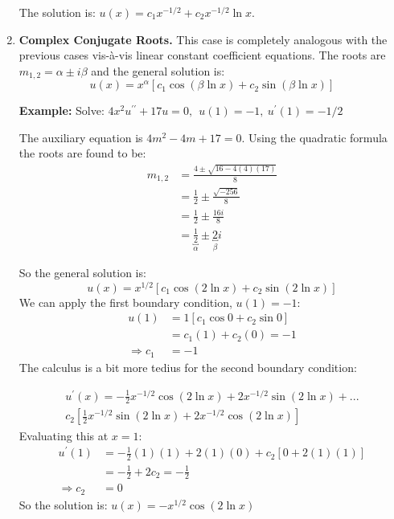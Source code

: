 \begin{enumerate}
The solution is: $u(x)=c_1x^{-1/2}+c_2x^{-1/2}\ln{x}$.

\vspace{0.5cm}

\item \textbf{Complex Conjugate Roots.}  This case is completely analogous with the previous cases vis-\`a-vis linear constant coefficient equations.  The roots are $m_{1,2} = \alpha \pm i\beta$ and the general solution is:
\begin{equation}
u(x) = x^{\alpha}\left[c_1 \cos{(\beta \ln{x})} + c_2 \sin{(\beta \ln{x})} \right]
\end{equation}

\vspace{0.5cm}

\noindent\textbf{Example:} Solve: $4x^2 u^{\prime \prime} +17u=0, \ \ u(1)=-1, \ u^{\prime}(1)=-1/2$

\vspace{0.25cm}

\noindent The auxiliary equation is $4m^2-4m+17=0$.  Using the quadratic formula the roots are found to be: 
\begin{align*}
m_{1,2} &= \frac{4 \pm \sqrt{16-4(4)(17)}}{8} \\
&=\frac{1}{2} \pm \frac{\sqrt{-256}}{8} \\
&=\frac{1}{2} \pm \frac{16i}{8} \\
&=\underbracket{\frac{1}{2}}_{\alpha} \pm \underbracket{2}_{\beta}i
\end{align*}

\noindent So the general solution is:
\begin{equation*}
u(x)=x^{1/2}\left[c_1 \cos{(2 \ln{x})}+c_2 \sin{(2 \ln{x})} \right]
\end{equation*}
We can apply the first boundary condition, $u(1)=-1$:
\begin{align*}
u(1) &= 1 \left[c_1 \cos{0} + c_2 \sin{0} \right] \\
&= c_1(1) + c_2(0) = -1 \\
\Rightarrow c_1&=-1
\end{align*}
The calculus is a bit more tedius for the second boundary condition:

\begin{multline*}
u^{\prime}(x) = -\frac{1}{2}x^{-1/2}\cos{(2 \ln{x})} + 2x^{-1/2}\sin{(2 \ln{x})} + ...\\
c_2\left[ \frac{1}{2} x^{-1/2} \sin{(2 \ln{x})} + 2x^{-1/2}\cos{(2 \ln{x})} \right]
\end{multline*}
Evaluating this at $x=1$:
\begin{align*}
u^{\prime}(1)&=-\frac{1}{2}(1)(1)+2(1)(0)+c_2[0+2(1)(1)] \\
&=-\frac{1}{2}+2c_2 = -\frac{1}{2} \\
\Rightarrow c_2&=0
\end{align*}
So the solution is: $u(x) = -x^{1/2}\cos{(2 \ln{x})}$

\end{enumerate}

